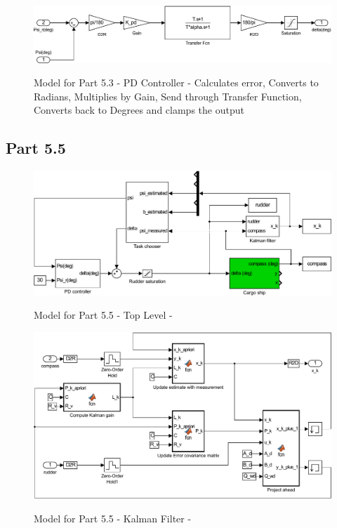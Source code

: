 \begin{subappendices}
\begin{figure}[h!]
\caption{Model for Part 5.3 - PD Controller - Calculates error, Converts to Radians, Multiplies by Gain, Send through Transfer Function, Converts back to Degrees and clamps the output}
	\centering
		\includegraphics[width=\textwidth]{images/simulink/ship_p3_pd_controller.pdf}
	\label{fig:ship_p3_pd_controller}
\end{figure}







\subsection{Part 5.5}
\begin{figure}[h!]
\caption{Model for Part 5.5 - Top Level - }
	\centering
		\includegraphics[width=\textwidth]{images/simulink/ship_p5.pdf}
	\label{fig:ship_p5}
\end{figure}

\begin{figure}[h!]
\caption{Model for Part 5.5 - Kalman Filter - }
	\centering
		\includegraphics[width=\textwidth]{images/simulink/ship_p5_kalman_filter.pdf}
	\label{fig:ship_p5_kalman_filter}
\end{figure}


\end{subappendices}
